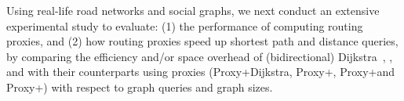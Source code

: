 


Using real-life road networks and social graphs, we next conduct an extensive experimental study to evaluate: (1) the performance of computing routing proxies, and (2) how routing proxies speed up shortest  path and distance queries, by comparing the efficiency and/or space overhead of (bidirectional) Dijkstra~\cite{LubyR89}, \arcflag \cite{MohringSSWW05}, \tnr \cite{arz2013transit} and \ah \cite{zhu2013shortest} with their counterparts using proxies (Proxy+Dijkstra, Proxy+\arcflag, Proxy+\tnr and Proxy+\ah) with respect to graph queries and graph sizes.








